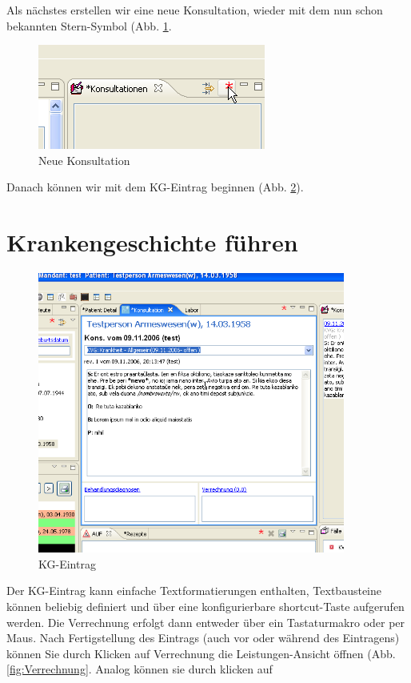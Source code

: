 Als nächstes erstellen wir eine neue Konsultation, wieder mit dem nun schon
bekannten Stern-Symbol (Abb. \ref{fig:neuekons}.
\begin{figure}[ht]
	\includegraphics{images/einf5}
	\caption{Neue Konsultation}
	\label{fig:neuekons}
\end{figure}
\pagebreak[2]
Danach können wir mit dem KG-Eintrag beginnen (Abb. \ref{fig:KG}).
\section{Krankengeschichte führen}
\begin{figure}[ht]
	\includegraphics[width=0.9\textwidth]{images/einf6}
	\caption{KG-Eintrag}
	\label{fig:KG}
\end{figure}
Der KG-Eintrag kann einfache Textformatierungen enthalten, Textbausteine können
beliebig definiert und über eine konfigurierbare shortcut-Taste aufgerufen werden. Die Verrechnung erfolgt dann entweder über ein Tastaturmakro oder per Maus.
Nach Fertigstellung des Eintrags (auch vor oder während des Eintragens) können
Sie durch Klicken auf \glqq Verrechnung\grqq{} die Leistungen-Ansicht öffnen
(Abb. \ref{fig:Verrechnung}. Analog können sie durch klicken auf
